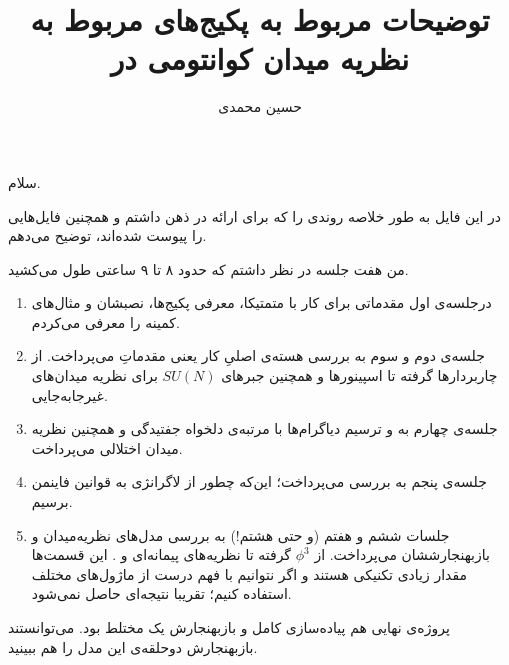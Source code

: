 \documentclass[a4paper, 12pt]{article}
\title{\textbf{
توضیحات مربوط به پکیج‌های مربوط به نظریه میدان کوانتومی در 
\lr{Mathematica}
}}
\author{حسین محمدی
\\}
\begin{document}
\maketitle

سلام.

در این فایل به طور خلاصه روندی را که برای ارائه در ذهن داشتم و همچنین فایل‌هایی را پیوست شده‌اند، توضیح می‌دهم.

من هفت جلسه‌ در نظر داشتم که حدود ۸ تا ۹ ساعتی طول می‌کشید. 
\begin{enumerate}
	\item 
	درجلسه‌ی اول مقدماتی برای کار با متمتیکا، معرفی پکیج‌ها، نصبشان و مثال‌های کمینه را معرفی می‌کردم.
	
	\item 
	جلسه‌ی دوم و سوم به بررسی هسته‌ی اصلیِ کار یعنی مقدماتِ 
	می‌پرداخت. از چاربردارها گرفته تا اسپینورها و همچنین جبرهای 
	$SU(N)$
	برای نظریه میدان‌های غیرجابه‌جایی.
	
	\item 
	جلسه‌ی چهارم به 
	و ترسیم دیاگرام‌ها با مرتبه‌ی دلخواه جفتیدگی و همچنین نظریه میدان اختلالی می‌پرداخت.
	
	\item 
	جلسه‌ی پنجم به بررسی 
	می‌پرداخت؛ این‌که چطور از لاگرانژی به قوانین فاینمن برسیم. 
	
	\item 
	جلسات ششم و هفتم (و حتی هشتم!) به بررسی مدل‌های نظریه‌میدان و بازبهنجارششان می‌پرداخت.
	از 
	$\phi^3$
	گرفته تا نظریه‌های پیمانه‌ای  و 
	.
	این قسمت‌ها مقدار زیادی تکنیکی هستند و اگر نتوانیم با فهم درست از ماژول‌های مختلف 
	استفاده کنیم؛ تقریبا نتیجه‌ای حاصل نمی‌شود.
\end{enumerate}


\begin{mdframed}
	پروژه‌ی نهایی هم پیاده‌سازی کامل و بازبهنجارش یک 
	مختلط بود.  می‌توانستند بازبهنجارش دوحلقه‌ی این مدل را هم ببینید.
\end{mdframed}
\end{document}
